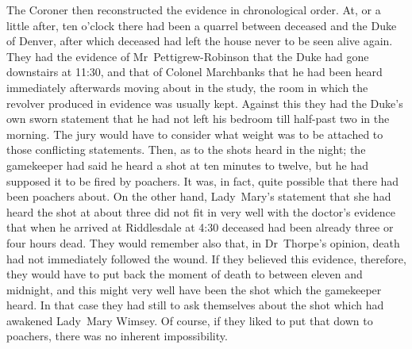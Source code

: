 The Coroner then reconstructed the evidence in chronological order.  At, or a little after, ten o'clock there had been a quarrel between deceased and the Duke of Denver, after which deceased had left the house never to be seen alive again. They had the evidence of Mr~Pettigrew-Robinson that the Duke had gone downstairs at 11:30, and that of Colonel Marchbanks that he had been heard immediately afterwards moving about in the study, the room in which the revolver produced in evidence was usually kept. Against this they had the Duke's own sworn statement that he had not left his bedroom till half-past two in the morning. The jury would have to consider what weight was to be attached to those conflicting statements. Then, as to the shots heard in the night; the gamekeeper had said he heard a shot at ten minutes to twelve, but he had supposed it to be fired by poachers. It was, in fact, quite possible that there had been poachers about. On the other hand, Lady~Mary's statement that she had heard the shot at about three  did not fit in very well with the doctor's evidence that when he arrived at Riddlesdale at 4:30 deceased had been already three or four hours dead. They would remember also that, in Dr~Thorpe's opinion, death had not immediately followed the wound. If they believed this evidence, therefore, they would have to put back the moment of death to between eleven  and midnight, and this might very well have been the shot which the gamekeeper heard. In that case they had still to ask themselves about the shot which had awakened Lady~Mary Wimsey.  Of course, if they liked to put that down to poachers, there was no inherent impossibility.

